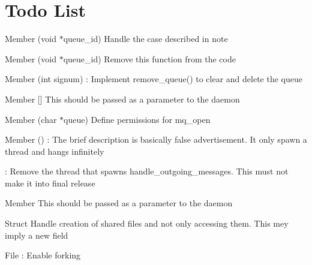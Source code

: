 \chapter{Todo List}
\hypertarget{todo}{}\label{todo}

\begin{DoxyRefList}
\item[Member \doxylink{tcfs__daemon__tools_8c_a24bb8f1eddd763598165ab8fa40fcdbd}{handle\+\_\+incoming\+\_\+messages} (void \texorpdfstring{$\ast$}{*}queue\+\_\+id)]\label{todo__todo000002}%
%
Handle the case described in note  
\item[Member \doxylink{tcfs__daemon__tools_8c_ab143feba805d6beda83eb69560c3c923}{handle\+\_\+outgoing\+\_\+messages} (void \texorpdfstring{$\ast$}{*}queue\+\_\+id)]\label{todo__todo000003}%
%
Remove this function from the code  
\item[Member \doxylink{tcfs__daemon_8c_a93d1097e4dd3c0735da3da2e89410090}{handle\+\_\+termination} (int signum)]\label{todo__todo000010}%
%
\+: Implement remove\+\_\+queue() to clear and delete the queue  
\item[Member \doxylink{redis_8c_ab146e06ef57318f58a840b315626b861}{HOST} \mbox{[}\mbox{]}]\label{todo__todo000005}%
%
This should be passed as a parameter to the daemon  
\item[Member \doxylink{queue_8c_a6997b2cacf3d2e49bc848d0274e24b13}{init\+\_\+queue} (char \texorpdfstring{$\ast$}{*}queue)]\label{todo__todo000004}%
%
Define permissions for mq\+\_\+open  
\item[Member \doxylink{tcfs__daemon_8c_ae66f6b31b5ad750f1fe042a706a4e3d4}{main} ()]\label{todo__todo000011}%
%
\+: The brief description is basically false advertisement. It only spawn a thread and hangs infinitely 



\+: Remove the thread that spawns handle\+\_\+outgoing\+\_\+messages. This must not make it into final release  
\item[Member \doxylink{redis_8c_a614217d263be1fb1a5f76e2ff7be19a2}{PORT} ]\label{todo__todo000006}%
%
This should be passed as a parameter to the daemon  
\item[Struct \doxylink{structqm__shared}{qm\+\_\+shared} ]\label{todo__todo000001}%
%
Handle creation of shared files and not only accessing them. This mey imply a new field  
\item[File \doxylink{tcfs__daemon_8c}{tcfs\+\_\+daemon.c} ]\label{todo__todo000007}%
%
\+: Enable forking 




\end{DoxyRefList}
